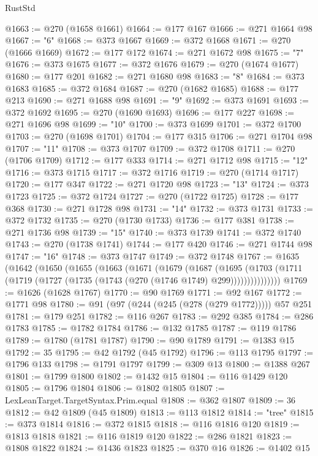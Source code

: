 \begin{lexlean}{RustStd}
\begin{coremodule}
@1663 := @270 (@1658 @1661)
@1664 := @177 @167
@1666 := @271 @1664 @98
@1667 := "6"
@1668 := @373 @1667
@1669 := @372 @1668
@1671 := @270 (@1666 @1669)
@1672 := @177 @172
@1674 := @271 @1672 @98
@1675 := "7"
@1676 := @373 @1675
@1677 := @372 @1676
@1679 := @270 (@1674 @1677)
@1680 := @177 @201
@1682 := @271 @1680 @98
@1683 := "8"
@1684 := @373 @1683
@1685 := @372 @1684
@1687 := @270 (@1682 @1685)
@1688 := @177 @213
@1690 := @271 @1688 @98
@1691 := "9"
@1692 := @373 @1691
@1693 := @372 @1692
@1695 := @270 (@1690 @1693)
@1696 := @177 @227
@1698 := @271 @1696 @98
@1699 := "10"
@1700 := @373 @1699
@1701 := @372 @1700
@1703 := @270 (@1698 @1701)
@1704 := @177 @315
@1706 := @271 @1704 @98
@1707 := "11"
@1708 := @373 @1707
@1709 := @372 @1708
@1711 := @270 (@1706 @1709)
@1712 := @177 @333
@1714 := @271 @1712 @98
@1715 := "12"
@1716 := @373 @1715
@1717 := @372 @1716
@1719 := @270 (@1714 @1717)
@1720 := @177 @347
@1722 := @271 @1720 @98
@1723 := "13"
@1724 := @373 @1723
@1725 := @372 @1724
@1727 := @270 (@1722 @1725)
@1728 := @177 @368
@1730 := @271 @1728 @98
@1731 := "14"
@1732 := @373 @1731
@1733 := @372 @1732
@1735 := @270 (@1730 @1733)
@1736 := @177 @381
@1738 := @271 @1736 @98
@1739 := "15"
@1740 := @373 @1739
@1741 := @372 @1740
@1743 := @270 (@1738 @1741)
@1744 := @177 @420
@1746 := @271 @1744 @98
@1747 := "16"
@1748 := @373 @1747
@1749 := @372 @1748
@1767 := @1635
    (@1642
      (@1650
        (@1655
          (@1663
            (@1671
              (@1679
                (@1687
                  (@1695
                    (@1703
                      (@1711 (@1719 (@1727 (@1735 (@1743 (@270 (@1746 @1749) @299)))))))))))))))
@1769 := @1626 (@1628 @1767)
@1770 := @90 @1769
@1771 := @92 @167
@1772 := @1771 @98
@1780 := @91 (@97 (@244 (@245 (@278 (@279 @1772))))) @57 @251
@1781 := @179 @251
@1782 := @116 @267
@1783 := @292 @385
@1784 := @286 @1783
@1785 := @1782 @1784
@1786 := @132 @1785
@1787 := @119 @1786
@1789 := @1780 (@1781 @1787)
@1790 := @90 @1789
@1791 := @1383 @15
@1792 := 35
@1795 := @42 @1792 (@45 @1792)
@1796 := @113 @1795
@1797 := @1796 @133
@1798 := @1791 @1797
@1799 := @309 @13
@1800 := @1388 @267
@1801 := @1799 @1800
@1802 := @1432 @15
@1804 := @116 @1429 @120
@1805 := @1796 @1804
@1806 := @1802 @1805
@1807 := LexLeanTarget.TargetSyntax.Prim.equal
@1808 := @362 @1807
@1809 := 36
@1812 := @42 @1809 (@45 @1809)
@1813 := @113 @1812
@1814 := "tree"
@1815 := @373 @1814
@1816 := @372 @1815
@1818 := @116 @1816 @120
@1819 := @1813 @1818
@1821 := @116 @1819 @120
@1822 := @286 @1821
@1823 := @1808 @1822
@1824 := @1436 @1823
@1825 := @370 @16
@1826 := @1402 @15

\end{coremodule}
\end{lexlean}
